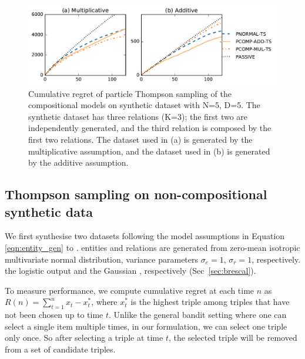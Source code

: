 \begin{figure}[t]
	\centering
	\includegraphics[width=\linewidth]{images/toy_comp_5_2_5.pdf}
	\caption{\label{fig:comp_synthetic} Cumulative regret of particle Thompson sampling of the compositional models on synthetic dataset with N=5, D=5. The synthetic dataset has three relations (K=3); the first two are independently generated, and the third relation is composed by the first two relations. The dataset used in (a) is generated by the multiplicative assumption, and the dataset used in (b) is generated by the additive assumption.}
\end{figure}

\subsection{Thompson sampling on non-compositional synthetic data}

We first synthesise two datasets
following the model assumptions in Equation \ref{eqn:entity_gen} to
\verify{\ref{eqn:triple_gen}}.
entities and relations are generated from zero-mean isotropic multivariate normal distribution, 
variance parameters $\sigma_e=1$, $\sigma_r=1$, respectively.
 the logistic output and the Gaussian , respectively (Sec~\ref{sec:brescal}).

To measure performance, we compute cumulative regret
at each time $n$ as $R(n) = \sum_{t=1}^{n} x_t - x^{*}_t$,
where $x^*_t$ is the highest triple among triples that have not been chosen up to time $t$. Unlike the general
bandit setting where one can select a single item multiple times, in our formulation, we can select one triple
only once. So after selecting a triple at time $t$, the selected triple will be removed from a set of candidate
triples.

